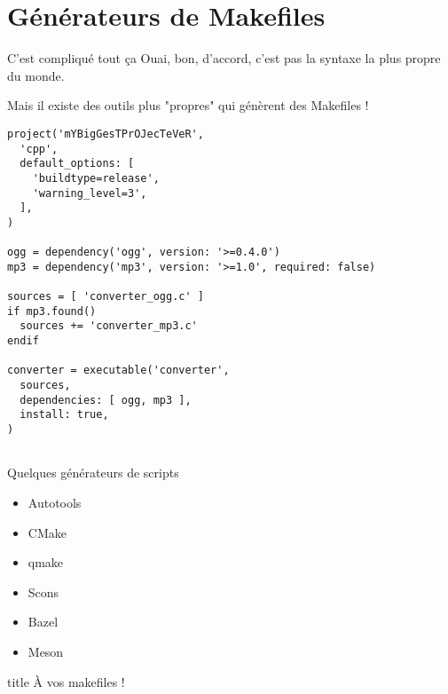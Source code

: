 \section{Générateurs de Makefiles}
\begin{frame}[fragile]{C'est compliqué tout ça\…}
Ouai, bon, d'accord, c'est pas la syntaxe la plus propre du monde.

\… Mais il existe des outils plus "propres" qui génèrent des Makefiles !
\begin{lstlisting}[title=Un projet Meson]
project('mYBigGesTPrOJecTeVeR',
  'cpp',
  default_options: [
    'buildtype=release',
    'warning_level=3',
  ],
)

ogg = dependency('ogg', version: '>=0.4.0')
mp3 = dependency('mp3', version: '>=1.0', required: false)

sources = [ 'converter_ogg.c' ]
if mp3.found()
  sources += 'converter_mp3.c'
endif

converter = executable('converter',
  sources,
  dependencies: [ ogg, mp3 ],
  install: true,
)
  
\end{lstlisting}
\end{frame}

\begin{frame}{Quelques générateurs de scripts}
\begin{itemize}
  \item Autotools 
  \item CMake 
  \item qmake 
  \item Scons 
  \item Bazel 
  \item Meson 
\end{itemize}

\end{frame}

\begin{frame}
  \vfill
  \centering
  \begin{beamercolorbox}[sep=8pt,center,shadow=true,rounded=true]{title}
    À vos makefiles !\par%
  \end{beamercolorbox}
  \vfill
\end{frame}
